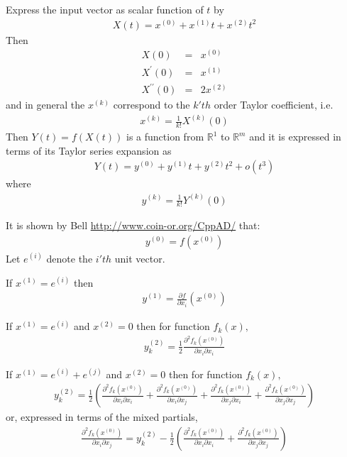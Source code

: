 \documentclass[11pt]{article}
\newcommand{\D}[2]{ \frac{\partial #1}{\partial #2} }
\newcommand{\DD}[3]{ \frac{\partial^2 #1}{\partial #2 \partial #3} }
\renewcommand{\_}{{\char"5F}}
\renewcommand{\{}{{\char"7B}}
\renewcommand{\}}{{\char"7D}}
\renewcommand{\^}{{\char"0D}}
\renewcommand{\'}{{\char"0D}}
\begin{document}
Express the input vector as scalar function of $t$ by
\begin{eqnarray}
X(t) = x^{(0)} +  x^{(1)} t +  x^{(2)} t^{2}
\end{eqnarray}
Then 
\begin{eqnarray*}
X(0) &=& x^{(0)} \\
X^{\prime}(0) &=& x^{(1)} \\
X^{\prime \prime }(0) &=& 2 x^{(2)}
\end{eqnarray*}
and in general the $x^{(k)}$ correspond to the $k'th$ order Taylor coefficient, i.e.
\begin{eqnarray*}
x^{(k)} = \frac{1}{k!}X^{(k)}(0)
\end{eqnarray*}
Then $Y(t) = f(X(t))$ is a function from $ \mathbb{R}^{1}$ to $ \mathbb{R}^{m}$ and it is expressed in terms of its Taylor series expansion as
\begin{eqnarray}
Y(t)  = y^{(0)} +  y^{(1)} t +  y^{(2)} t^{2} + o(t^{3})
\end{eqnarray} 
where 
\begin{eqnarray}
y^{(k)} = \frac{1}{k!} Y^{(k)}(0)  \label{eq:taylorcoeff}
\end{eqnarray}



It is shown by Bell \url{http://www.coin-or.org/CppAD/} that:
\begin{eqnarray}
y^{(0)} = f(x^{(0)}) \label{eq:forward0Result}
\end{eqnarray}
Let $e^{(i)}$ denote the $i'th$ unit vector. 

If $x^{(1)} = e^{(i)}$ then
\begin{eqnarray}
y^{(1)} = \D{f}{x_{i}}(x^{(0)})  \label{eq:forward1Result}
\end{eqnarray}

If $x^{(1)} = e^{(i)}$ and $x^{(2)} = 0$ then for function $f_{k}(x),$
\begin{eqnarray}
y^{(2)}_{k} =  \frac{1}{2} \DD{f_{k}(x^{(0)})}{x_{i}}{x_{i}}  \label{eq:forward2Resulta}
\end{eqnarray}

If $x^{(1)} = e^{(i)} + e^{(j)}$ and $x^{(2)} = 0$ then for function $f_{k}(x),$
\begin{eqnarray}
y^{(2)}_{k} =  \frac{1}{2} \left( \DD{f_{k}(x^{(0)})}{x_{i}}{x_{i}}  +   \DD{f_{k}(x^{(0)})}{x_{i}}{x_{j}} +  \DD{f_{k}(x^{(0)})}{x_{j}}{x_{i}} +  \DD{f_{k}(x^{(0)})}{x_{j}}{x_{j}}  \right) \label{eq:forward2Resultb}
\end{eqnarray}
or, expressed in terms of the mixed partials,
\begin{eqnarray}
  \DD{f_{k}(x^{(0)})}{x_{i}}{x_{j}}  = y_{k}^{(2)}  -  \frac{1}{2} \left( \DD{f_{k}(x^{(0)})}{x_{i}}{x_{i}}  +  \DD{f_{k}(x^{(0)})}{x_{j}}{x_{j}}  \right) \label{eq:forward2Resultc}
\end{eqnarray}
\end{document}
